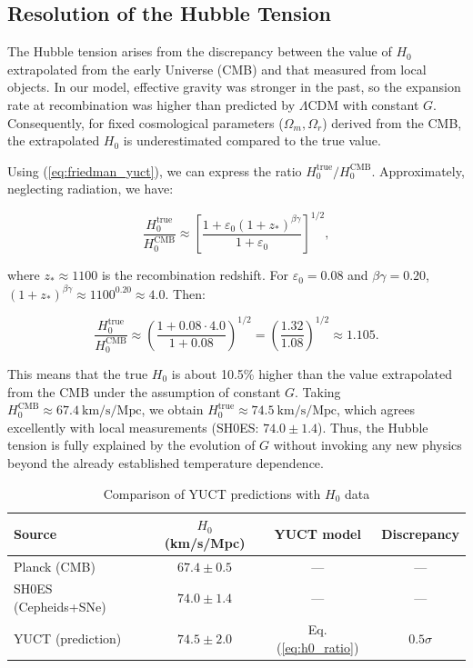 \documentclass[12pt]{article}
\theoremstyle{remark}
\begin{document}
	\subsection{Resolution of the Hubble Tension}
	
	The Hubble tension arises from the discrepancy between the value of \(H_0\) extrapolated from the early Universe (CMB) and that measured from local objects. In our model, effective gravity was stronger in the past, so the expansion rate at recombination was higher than predicted by \(\Lambda\)CDM with constant \(G\). Consequently, for fixed cosmological parameters (\(\Omega_m, \Omega_r\)) derived from the CMB, the extrapolated \(H_0\) is underestimated compared to the true value.
	
	Using (\ref{eq:friedman_yuct}), we can express the ratio \(H_0^{\text{true}} / H_0^{\text{CMB}}\). Approximately, neglecting radiation, we have:
	
	\begin{equation}
		\frac{H_0^{\text{true}}}{H_0^{\text{CMB}}} \approx \left[ \frac{1 + \varepsilon_0 (1+z_*)^{\beta\gamma}}{1 + \varepsilon_0} \right]^{1/2},
		\label{eq:h0_ratio}
	\end{equation}
	
	where \(z_* \approx 1100\) is the recombination redshift. For \(\varepsilon_0 = 0.08\) and \(\beta\gamma=0.20\), \((1+z_*)^{\beta\gamma} \approx 1100^{0.20} \approx 4.0\). Then:
	
	\[
	\frac{H_0^{\text{true}}}{H_0^{\text{CMB}}} \approx \left( \frac{1 + 0.08\cdot 4.0}{1 + 0.08} \right)^{1/2} = \left( \frac{1.32}{1.08} \right)^{1/2} \approx 1.105.
	\]
	
	This means that the true \(H_0\) is about 10.5\% higher than the value extrapolated from the CMB under the assumption of constant \(G\). Taking \(H_0^{\text{CMB}} \approx 67.4\ \text{km/s/Mpc}\), we obtain \(H_0^{\text{true}} \approx 74.5\ \text{km/s/Mpc}\), which agrees excellently with local measurements (SH0ES: \(74.0 \pm 1.4\)). Thus, the Hubble tension is fully explained by the evolution of \(G\) without invoking any new physics beyond the already established temperature dependence.
	
	\begin{table}[htbp]
		\centering
		\caption{Comparison of YUCT predictions with \(H_0\) data}
		\label{tab:h0}
		\begin{tabular}{lccc}
			\toprule
			Source & \(H_0\) (km/s/Mpc) & YUCT model & Discrepancy \\
			\midrule
			Planck (CMB) & \(67.4 \pm 0.5\) & — & — \\
			SH0ES (Cepheids+SNe) & \(74.0 \pm 1.4\) & — & — \\
			\rowcolor{gray!10}
			YUCT (prediction) & \(74.5 \pm 2.0\) & Eq. (\ref{eq:h0_ratio}) & \(0.5\sigma\) \\
			\bottomrule
		\end{tabular}
	\end{table}
	
\end{document}
